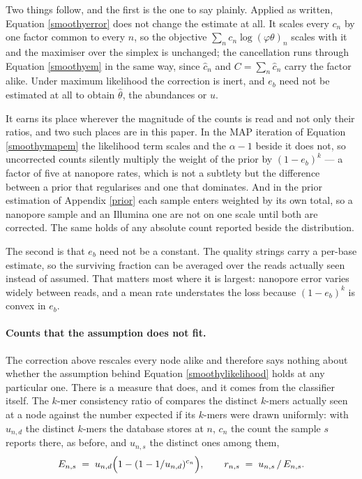 \documentclass[pdflatex,sn-vancouver-num]{sn-jnl}
\begin{document}
    Two things follow, and the first is the one to say plainly. Applied as written,
    Equation \eqref{smoothyerror} does not change the estimate at all. It scales every $c_n$ by one
    factor common to every $n$, so the objective $\sum_n c_n \log (\varphi\theta)_n$ scales with it and
    the maximiser over the simplex is unchanged; the cancellation runs through
    Equation \eqref{smoothyem} in the same way, since $\hat{c}_n$ and $C = \sum_n \hat{c}_n$ carry the
    factor alike. Under maximum likelihood the correction is inert, and $e_b$ need not be estimated at
    all to obtain $\hat{\theta}$, the abundances or $u$.

    It earns its place wherever the magnitude of the counts is read and not only their ratios, and
    two such places are in this paper. In the MAP iteration of Equation \eqref{smoothymapem} the
    likelihood term scales and the $\alpha - 1$ beside it does not, so uncorrected counts silently
    multiply the weight of the prior by $(1 - e_b)^k$ --- a factor of five at nanopore rates, which is
    not a subtlety but the difference between a prior that regularises and one that dominates. And in
    the prior estimation of Appendix \ref{prior} each sample enters weighted by its own total, so a
    nanopore sample and an Illumina one are not on one scale until both are corrected. The same holds
    of any absolute count reported beside the distribution.

    The second is that $e_b$ need not be a constant. The quality strings carry a per-base estimate,
    so the surviving fraction can be averaged over the reads actually seen instead of assumed. That
    matters most where it is largest: nanopore error varies widely between reads, and a mean rate
    understates the loss because $(1 - e_b)^k$ is convex in $e_b$.

    \paragraph{Counts that the assumption does not fit.} The correction above rescales every node
    alike and therefore says nothing about whether the assumption behind
    Equation \eqref{smoothylikelihood} holds at any particular one. There is a measure that does, and
    it comes from the classifier itself. The $k$-mer consistency ratio of \citet{genestrip-pub}
    compares the distinct $k$-mers actually seen at a node against the number expected if its
    $k$-mers were drawn uniformly: with $u_{n,d}$ the distinct $k$-mers the database stores at $n$,
    $c_n$ the count the sample $s$ reports there, as before, and $u_{n,s}$ the distinct ones among
    them,
    \begin{equation}\label{smoothyconsistency}
        E_{n,s} \;=\; u_{n,d} \Bigl( 1 - (1 - 1/u_{n,d})^{c_n} \Bigr),
        \qquad r_{n,s} \;=\; u_{n,s} \,/\, E_{n,s} .
    \end{equation}
\end{document}
